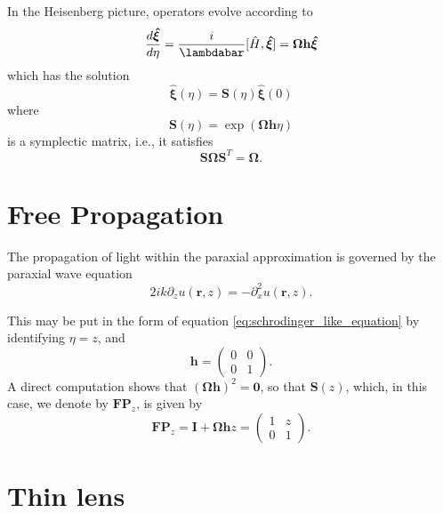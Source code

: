\documentclass[a4paper,10pt]{report}
\begin{document}
In the Heisenberg picture, operators evolve according to
\begin{equation}
\frac{d\boldsymbol{\hat{\xi}}}{d\eta} = \frac{i}{\lambdabar} [\hat{H}, \boldsymbol{\hat{\xi}}] = \boldsymbol{\Omega} \mathbf{h} \boldsymbol{\hat{\xi}}
\end{equation}
which has the solution
\begin{equation}
\boldsymbol{\hat{\xi}}(\eta) = \mathbf{S}(\eta) \boldsymbol{\hat{\xi}}(0)
\end{equation}
where
\begin{equation}\mathbf{S}(\eta) = \exp(\boldsymbol{\Omega} \mathbf{h} \eta)\end{equation}
is a symplectic matrix, i.e., it satisfies
\begin{equation}\mathbf{S}\boldsymbol{\Omega} \mathbf{S}^T = \boldsymbol{\Omega}.\end{equation}

\section{Free Propagation}

The propagation of light within the paraxial approximation is governed by the paraxial wave equation
\begin{equation}
    2ik\partial_z u(\mathbf{r}, z) = -\partial_x^2 u(\mathbf{r}, z).
\end{equation}

This may be put in the form of equation \eqref{eq:schrodinger_like_equation} by identifying $\eta = z$, and
\begin{equation}
    \mathbf{h} = \begin{pmatrix}
        0 & 0 \\
        0 & 1
    \end{pmatrix} .
\end{equation}
A direct computation shows that $(\boldsymbol{\Omega}\mathbf{h})^2 = \boldsymbol{0}$, so that $\mathbf{S}(z)$, which, in this case, we denote by $\mathbf{FP}_z$, is given by
\begin{equation}
    \mathbf{FP}_z = \boldsymbol{I} + \boldsymbol{\Omega}\mathbf{h} z = \begin{pmatrix}
        1 & z \\
        0 & 1
    \end{pmatrix} .
\end{equation}

\section{Thin lens}
\end{document}
